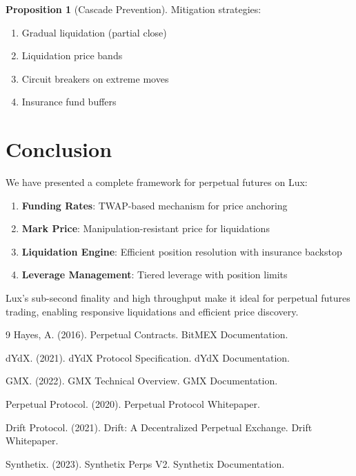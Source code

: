 \documentclass[11pt,a4paper]{article}
\theoremstyle{definition}
\newtheorem{proposition}{Proposition}
\begin{document}
\begin{proposition}[Cascade Prevention]
Mitigation strategies:
\begin{enumerate}
\item Gradual liquidation (partial close)
\item Liquidation price bands
\item Circuit breakers on extreme moves
\item Insurance fund buffers
\end{enumerate}
\end{proposition}

\section{Conclusion}

We have presented a complete framework for perpetual futures on Lux:

\begin{enumerate}
\item \textbf{Funding Rates}: TWAP-based mechanism for price anchoring
\item \textbf{Mark Price}: Manipulation-resistant price for liquidations
\item \textbf{Liquidation Engine}: Efficient position resolution with insurance backstop
\item \textbf{Leverage Management}: Tiered leverage with position limits
\end{enumerate}

Lux's sub-second finality and high throughput make it ideal for perpetual futures trading, enabling responsive liquidations and efficient price discovery.

\begin{thebibliography}{9}
Hayes, A. (2016). Perpetual Contracts. BitMEX Documentation.

dYdX. (2021). dYdX Protocol Specification. dYdX Documentation.

GMX. (2022). GMX Technical Overview. GMX Documentation.

Perpetual Protocol. (2020). Perpetual Protocol Whitepaper.

Drift Protocol. (2021). Drift: A Decentralized Perpetual Exchange. Drift Whitepaper.

Synthetix. (2023). Synthetix Perps V2. Synthetix Documentation.
\end{thebibliography}
\end{document}

